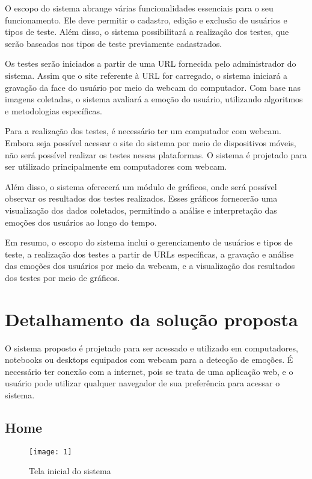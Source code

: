 O escopo do sistema abrange várias funcionalidades essenciais para o seu funcionamento. Ele deve permitir o cadastro, edição e exclusão de usuários e tipos de teste. Além disso, o sistema possibilitará a realização dos testes, que serão baseados nos tipos de teste previamente cadastrados.

Os testes serão iniciados a partir de uma URL fornecida pelo administrador do sistema. Assim que o site referente à URL for carregado, o sistema iniciará a gravação da face do usuário por meio da webcam do computador. Com base nas imagens coletadas, o sistema avaliará a emoção do usuário, utilizando algoritmos e metodologias específicas.

Para a realização dos testes, é necessário ter um computador com webcam. Embora seja possível acessar o site do sistema por meio de dispositivos móveis, não será possível realizar os testes nessas plataformas. O sistema é projetado para ser utilizado principalmente em computadores com webcam.

Além disso, o sistema oferecerá um módulo de gráficos, onde será possível observar os resultados dos testes realizados. Esses gráficos fornecerão uma visualização dos dados coletados, permitindo a análise e interpretação das emoções dos usuários ao longo do tempo.

Em resumo, o escopo do sistema inclui o gerenciamento de usuários e tipos de teste, a realização dos testes a partir de URLs específicas, a gravação e análise das emoções dos usuários por meio da webcam, e a visualização dos resultados dos testes por meio de gráficos.

\section{Detalhamento da solução proposta}

O sistema proposto é projetado para ser acessado e utilizado em computadores, notebooks ou desktops equipados com webcam para a detecção de emoções. É necessário ter conexão com a internet, pois se trata de uma aplicação web, e o usuário pode utilizar qualquer navegador de sua preferência para acessar o sistema.

\subsection{Home}

\begin{figure}[h]
  \caption{Tela inicial do sistema}
  \centering
  \texttt{[image: 1]}
\end{figure}
\FloatBarrier


